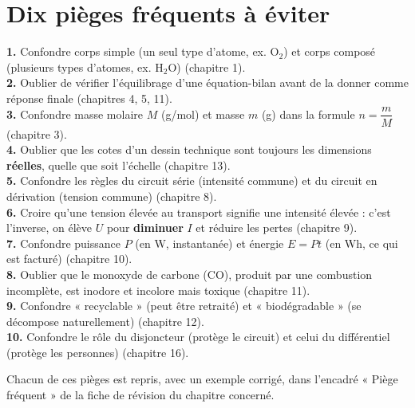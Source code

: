 \section{Dix pièges fréquents à éviter}

\begin{synthese}
\textbf{1.} Confondre corps simple (un seul type d'atome, ex. $\mathrm{O_2}$) et corps
composé (plusieurs types d'atomes, ex. $\mathrm{H_2O}$) (chapitre 1).\\[3pt]
\textbf{2.} Oublier de vérifier l'équilibrage d'une équation-bilan avant de la donner
comme réponse finale (chapitres 4, 5, 11).\\[3pt]
\textbf{3.} Confondre masse molaire $M$ (g/mol) et masse $m$ (g) dans la formule
$n=\dfrac mM$ (chapitre 3).\\[3pt]
\textbf{4.} Oublier que les cotes d'un dessin technique sont toujours les dimensions
\textbf{réelles}, quelle que soit l'échelle (chapitre 13).\\[3pt]
\textbf{5.} Confondre les règles du circuit série (intensité commune) et du circuit en
dérivation (tension commune) (chapitre 8).\\[3pt]
\textbf{6.} Croire qu'une tension élevée au transport signifie une intensité élevée :
c'est l'inverse, on élève $U$ pour \textbf{diminuer} $I$ et réduire les pertes (chapitre
9).\\[3pt]
\textbf{7.} Confondre puissance $P$ (en W, instantanée) et énergie $E=Pt$ (en Wh, ce qui
est facturé) (chapitre 10).\\[3pt]
\textbf{8.} Oublier que le monoxyde de carbone (CO), produit par une combustion
incomplète, est inodore et incolore mais toxique (chapitre 11).\\[3pt]
\textbf{9.} Confondre « recyclable » (peut être retraité) et « biodégradable » (se
décompose naturellement) (chapitre 12).\\[3pt]
\textbf{10.} Confondre le rôle du disjoncteur (protège le circuit) et celui du
différentiel (protège les personnes) (chapitre 16).
\end{synthese}

\begin{remarque}
Chacun de ces pièges est repris, avec un exemple corrigé, dans l'encadré « Piège
fréquent » de la fiche de révision du chapitre concerné.
\end{remarque}
